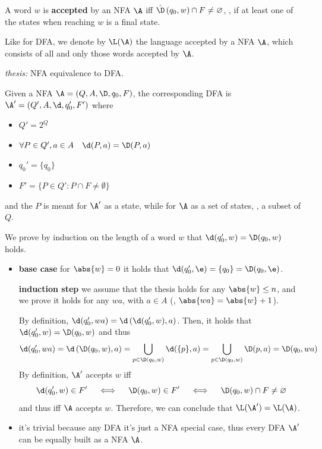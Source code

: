 \documentclass[oneside]{academica}
\begin{document}
\begin{theorem*}
  A word $w$ is \textbf{accepted} by an NFA $\A$ iff $\hat{\D}\left( q_0, w \right) \cap F \neq \emptyset$, \ie, if at least one of the states when reaching $w$ is a final state.
\end{theorem*}

Like for DFA, we denote by $\L(\A)$ the language accepted by a NFA $\A$, which consists of all and only those words accepted by $\A$.


\newpage

\begin{proof*}
  \textit{thesis:} NFA equivalence to DFA.

  \medskip
  Given a NFA $\A = \left(Q,A,\D,q_0,F\right)$, the corresponding DFA is $\A' = \left(Q',A,\d,q_0',F'\right)$ where
  \begin{itemize}
    \item $Q' = 2^Q$
    \item $\forall P \in Q', a \in A \quad \d(P,a) = \D(P,a)$
    \item $q_0' = \{ q_0 \}$
    \item $F' = \{ P \in Q' : P \cap F \neq \emptyset \}$
  \end{itemize}
  and the $P$ is meant for $\A'$ as a state, while for $\A$ as a set of states, \ie, a subset of $Q$.

  \medskip
  We prove by induction on the length of a word $w$ that $\d(q_0',w) = \D(q_0,w)$ holds.
  \begin{itemize}
    \item[\color{pink!200}$\Rightarrow$] \textbf{base case} \quad for $\abs{w} = 0$ it holds that $\d(q_0', \e) = \{q_0\} = \D(q_0,\e)$.

      \textbf{induction step} \quad we assume that the thesis holds for any $\abs{w} \le n$, and we prove it holds for any $wa$, with $a \in A$ (\ie, $\abs{wa} = \abs{w} + 1$).

      By definition, $\d(q_0',wa) = \d\left(\d(q_0',w),a\right)$.
      Then, it holds that $\d(q_0',w) = \D(q_0,w)$ and thus
      \begin{equation*}
        \d(q_0',wa) = \d\left(\D(q_0,w),a\right) = \bigcup_{p \in \D(q_0,w)} \d(\{p\},a) = \bigcup_{p \in \D(q_0,w)} \D(p,a) = \D(q_0,wa)
      \end{equation*}
      By definition, $\A'$ accepts $w$ iff
      \begin{equation*}
        \d(q_0',w) \in F' \quad\iff\quad \D(q_0,w) \in F' \quad\iff\quad \D(q_0,w) \cap F \neq \emptyset
      \end{equation*}
      and thus iff $\A$ accepts $w$.
      Therefore, we can conclude that $\L(\A') = \L(\A)$.
    \item[\color{pink!200}$\Leftarrow$] it's trivial because any DFA it's just a NFA special case, thus every DFA $\A'$ can be equally built as a NFA $\A$.
  \end{itemize}
\end{proof*}
\end{document}
